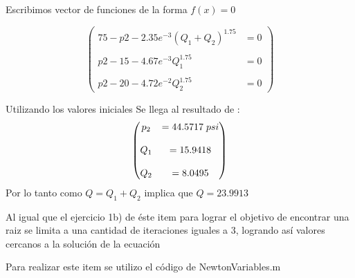 \documentclass{udparticle}
\begin{document}
\begin{enumerate}
    Escribimos vector de funciones de la forma $f(x) = 0$

   $$\begin{pmatrix}
        75 - p2 - 2.35e^{-3}(Q_1+Q_2)^{1.75} &= 0 \\
        \\
        p2 - 15 - 4.67e^{-3}Q_1^{1.75} &= 0  \\
        \\
        p2 - 20 - 4.72e^{-2}Q_2^{1.75} &= 0
    \end{pmatrix}$$
    
    Utilizando los valores iniciales Se llega al resultado de : 
    $$\begin{pmatrix}
        p_2 &=44.5717 \hspace{0.1cm} psi \\
        \\
        Q_1 &=15.9418 \\
        \\
        Q_2 &=8.0495
    \end{pmatrix}$$
    Por lo tanto como $Q = Q_1 + Q_2 $ implica que $ Q = 23.9913 $
    
    Al igual que el ejercicio 1b) de éste item para lograr el objetivo de encontrar una raiz se limita a una cantidad de iteraciones iguales a 3, logrando así valores cercanos a la solución de la ecuación
    
    Para realizar este item se utilizo el código de NewtonVariables.m
    \end{enumerate}
    
\end{document}
